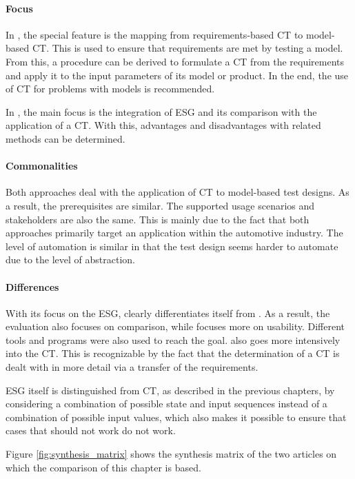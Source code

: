 \paragraph{Focus}

In \cite{Conrad}, the special feature is the mapping from requirements-based CT to model-based CT. This is used to ensure that requirements are met by testing a model. From this, a procedure can be derived to formulate a CT from the requirements and apply it to the input parameters of its model or product. In the end, the use of CT for problems with models is recommended. 

In \cite{Belli}, the main focus is the integration of ESG and its comparison with the application of a CT. With this, advantages and disadvantages with related methods can be determined.

\paragraph{Commonalities}

Both approaches deal with the application of CT to model-based test designs. As a result, the prerequisites are similar. The supported usage scenarios and stakeholders are also the same. This is mainly due to the fact that both approaches primarily target an application within the automotive industry. The level of automation is similar in that the test design seems harder to automate due to the level of abstraction.

\paragraph{Differences}

With its focus on the ESG, \cite{Belli} clearly differentiates itself from \cite{Conrad}. As a result, the evaluation also focuses on comparison, while \cite{Conrad} focuses more on usability. Different tools and programs were also used to reach the goal. \cite{Conrad} also goes more intensively into the CT. This is recognizable by the fact that the determination of a CT is dealt with in more detail via a transfer of the requirements.

ESG itself is distinguished from CT, as described in the previous chapters, by considering a combination of possible state and input sequences instead of a combination of possible input values, which also makes it possible to ensure that cases that should not work do not work.

Figure \ref{fig:synthesis_matrix} shows the synthesis matrix of the two articles on which the comparison of this chapter is based. 

